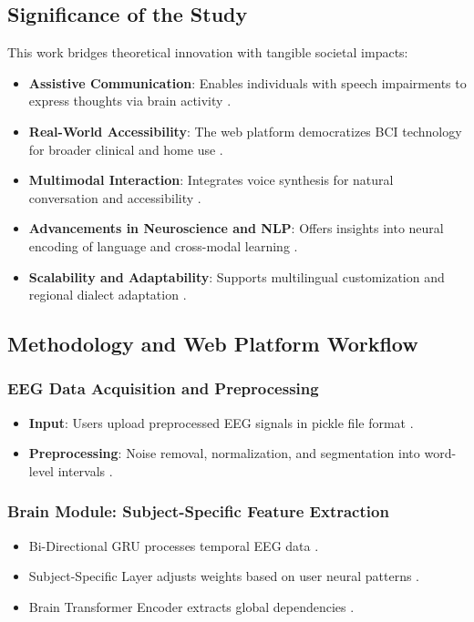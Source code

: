 \documentclass[journal]{IEEEtran}
\begin{document}
\subsection{Significance of the Study}
This work bridges theoretical innovation with tangible societal impacts:
\begin{itemize}
	\item \textbf{Assistive Communication}: Enables individuals with speech impairments to express thoughts via brain activity \cite{Moses2021}.
	\item \textbf{Real-World Accessibility}: The web platform democratizes BCI technology for broader clinical and home use \cite{Nieto2022}.
	\item \textbf{Multimodal Interaction}: Integrates voice synthesis for natural conversation and accessibility \cite{Willett2023}.
	\item \textbf{Advancements in Neuroscience and NLP}: Offers insights into neural encoding of language and cross-modal learning \cite{Caucheteux2022}.
	\item \textbf{Scalability and Adaptability}: Supports multilingual customization and regional dialect adaptation \cite{Wang2022}.
\end{itemize}

\subsection{Methodology and Web Platform Workflow}
\subsubsection{EEG Data Acquisition and Preprocessing}
\begin{itemize}
	\item \textbf{Input}: Users upload preprocessed EEG signals in pickle file format \cite{Hollenstein2018}.
	\item \textbf{Preprocessing}: Noise removal, normalization, and segmentation into word-level intervals \cite{Duan2023}.
\end{itemize}

\subsubsection{Brain Module: Subject-Specific Feature Extraction}
\begin{itemize}
	\item Bi-Directional GRU processes temporal EEG data \cite{Cho2014}.
	\item Subject-Specific Layer adjusts weights based on user neural patterns \cite{Jeng2020}.
	\item Brain Transformer Encoder extracts global dependencies \cite{Vaswani2017}.
\end{itemize}
\end{document}
